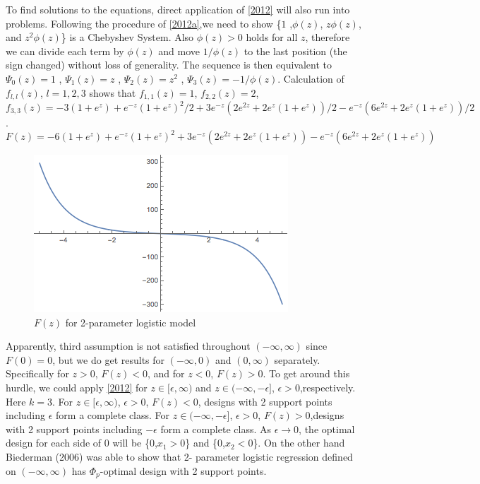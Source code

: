 \documentclass[11pt]{amsart}
\theoremstyle{definition}
\theoremstyle{remark}
\begin{document}
To find solutions to the equations, direct application of \ref{2012} will also run into problems. Following the procedure of \ref{2012a},we need to show \{$1$ ,$ \phi(z)$, $z\phi(z)$, and $z^2\phi(z)$\} is a Chebyshev System. Also $\phi(z)>0$ holds for all $z$, therefore we can divide each term by $\phi(z)$ and move $1/\phi(z)$ to the last position (the sign changed) without loss of generality. The sequence is then equivalent to $\Psi_0(z) = 1$ , $\Psi_1(z) = z$ , $\Psi_2(z) = z^2$ , $\Psi_3(z) = -1/\phi(z)$. Calculation of $f_{l,l}(z)$, $l=1,2,3$ shows that $f_{1,1}(z) = 1$, $f_{2,2}(z) = 2$, $f_{3,3}(z) = -3 (1 + e^z) + e^{-z} (1 + e^z)^2/2 + 
 3 e^{-z} (2 e^{2 z} + 2 e^z (1 + e^z))/2 - 
 e^{-z} (6 e^{2 z} + 2 e^z (1 + e^z))/2 $.  \[F(z) = -6 (1 + e^z) + e^{-z} (1 + e^z)^2 + 
 3 e^{-z} (2 e^{2 z} + 2 e^z (1 + e^z)) - 
 e^{-z} (6 e^{2 z} + 2 e^z (1 + e^z))\]
 \begin{figure}[h]
     \centering
     \includegraphics[scale = 0.5]{logistic.png}
     \caption{$F(z)$ for 2-parameter logistic model}
     \label{fig:logistic}
 \end{figure}
 Apparently, third assumption is not satisfied throughout $(-\infty,\infty)$ since $F(0)=0$, but we do get results for $(-\infty,0)$ and $(0,\infty)$ separately. Specifically for $z>0$, $F(z) <0$, and for $z<0$, $F(z) >0$. To get around this hurdle, we could apply \ref{2012} for $z\in[\epsilon, \infty)$ and $z\in(-\infty,-\epsilon]$, $\epsilon>0$,respectively. Here $k=3$. For $z\in[\epsilon, \infty)$, $\epsilon>0$, $F(z)<0$,  designs with 2 support points including $\epsilon$ form a complete class. For $z\in(-\infty,-\epsilon]$, $\epsilon>0$, $F(z)>0$,designs with 2 support points including $-\epsilon$ form a complete class. As $\epsilon\to 0$, the optimal design for each side of $0$ will be \{0,$x_1>0$\} and \{0,$x_2<0$\}. On the other hand Biederman (2006) was able to show that 2- parameter logistic regression defined on $(-\infty,\infty)$ has $\Phi_p$-optimal design with 2 support points.
 
\end{document}
